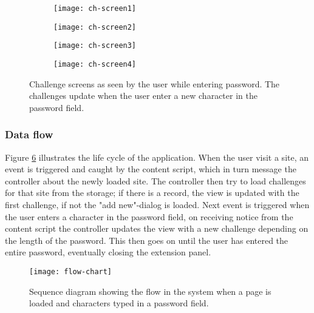\begin{figure}
    \centering
    \begin{subfigure}[t]{0.45\textwidth}
        \centering
        \texttt{[image: ch-screen1]} 
        \caption{}
        \label{challenge-screen1}
    \end{subfigure}
    \hfill
    \begin{subfigure}[t]{0.45\textwidth}
        \centering
        \texttt{[image: ch-screen2]} 
        \caption{}
        \label{challenge-screen2}
    \end{subfigure}
    \hfill
    \begin{subfigure}[t]{0.45\textwidth}
        \centering
        \texttt{[image: ch-screen3]} 
        \caption{}
        \label{challenge-screen3}
    \end{subfigure}
    \hfill
    \begin{subfigure}[t]{0.45\textwidth}
        \centering
        \texttt{[image: ch-screen4]} 
        \caption{}
        \label{challenge-screen4}
    \end{subfigure}
    \caption{Challenge screens as seen by the user while entering password. The challenges update when the user enter a new character in the password field.}
    \label{ch-screens}
\end{figure}


\newpage

\subsubsection{Data flow}\label{data-flow}
Figure \ref{flow-chart} illustrates the life cycle of the application. When the user visit a site, an event is triggered and caught by the content script, which in turn message the controller about the newly loaded site. The controller then try to load challenges for that site from the storage; if there is a record, the view is updated with the first challenge, if not the "add new"-dialog is loaded. Next event is triggered when the user enters a character in the password field, on receiving notice from the content script the controller updates the view with a new challenge depending on the length of the password. This then goes on until the user has entered the entire password, eventually closing the extension panel.
\begin{figure}
    \centering
    \texttt{[image: flow-chart]} 
    \caption{Sequence diagram showing the flow in the system when a page is loaded and characters typed in a password field.}
    \label{flow-chart}
\end{figure}

